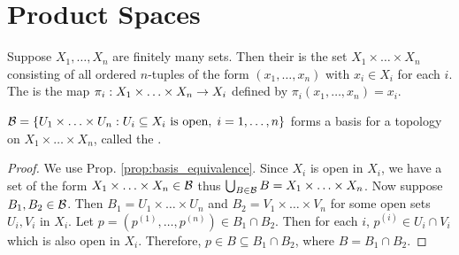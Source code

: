 \documentclass[11pt,a4paper]{article}
\begin{document}
\section{Product Spaces}

\begin{definition}
Suppose $X_1,\ldots, X_n$ are finitely many sets. Then their  is the set $X_1\times\ldots\times X_n$ consisting of all ordered $n$-tuples of the form $(x_1,\ldots,x_n)$ with $x_i\in X_i$ for each $i$. The  is the map $\pi_i:X_1\times\ldots\times X_n\rightarrow X_i$ defined by $\pi_i(x_1,\ldots,x_n) = x_i$.
\end{definition}

\begin{proposition}
$\mathcal{B} = \{U_1\times \ldots\times U_n:U_i\subseteq X_i\text{ is open},\; i = 1,\ldots, n\}$ forms a basis for a topology on $X_1\times\ldots\times X_n$, called the .
\end{proposition}

\begin{proof}
We use Prop. \ref{prop:basis_equivalence}. Since $X_i$ is open in $X_i$, we have a set of the form $X_1\times\ldots\times X_n\in \mathcal{B}$ thus $\bigcup_{B\in \mathcal{B}} B = X_1\times\ldots\times X_n$.  Now suppose $B_1,B_2\in \mathcal{B}$. Then $B_1 = U_1\times \ldots\times U_n$ and $B_2 = V_1\times \ldots\times V_n$ for some open sets $U_i, V_i$ in $X_i$. Let $p = (p^{(1)},\ldots,p^{(n)})\in B_1\cap B_2$. Then for each $i$, $p^{(i)}\in U_i\cap V_i$ which is also open in $X_i$. Therefore, $p\in B\subseteq B_1\cap B_2$, where $B = B_1\cap B_2$.
\end{proof}
\end{document}
